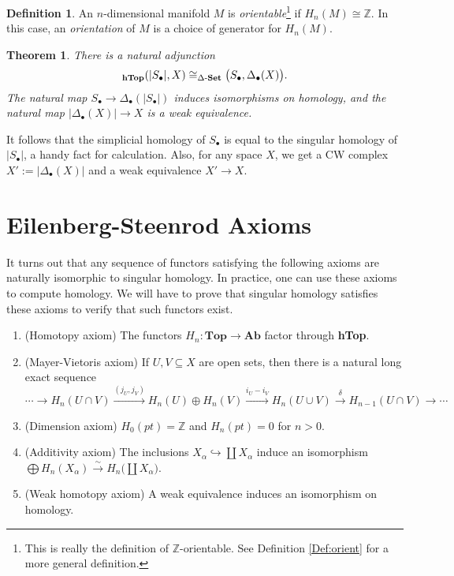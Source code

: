 \documentclass[12pt]{article}
\theoremstyle{plain}
\newtheorem{theorem}[equation]{Theorem}
\theoremstyle{definition}
\newtheorem{definition}[equation]{Definition}
\theoremstyle{remark}
\let\hom\relax %
\DeclareMathOperator{\hom}{Hom}
\newcommand{\ZZ}{\ensuremath{\mathbb{Z}}}
\begin{document}
 \begin{definition}
   An $n$-dimensional manifold $M$ is \emph{orientable}\footnote{This is really the
   definition of $\ZZ$-orientable. See Definition \ref{Def:orient} for a more general
   definition.} if $H_n(M)\cong \ZZ$. In this case, an \emph{orientation} of $M$ is a
   choice of generator for $H_n(M)$.
 \end{definition}
 \begin{theorem}\label{T:DeltaGeomAdjunction}
   There is a natural adjunction
   \[
    \hom_\textrm{\bf hTop}(|S_\bullet|,X) \cong \hom_{\Delta\textrm{-\bf Set}}\bigl(S_\bullet,
    \Delta_\bullet (X)\bigr).
   \]
   The natural map $S_\bullet\to \Delta_\bullet( |S_\bullet|)$ induces isomorphisms on
   homology, and the natural map $|\Delta_\bullet(X)|\to X$ is a weak equivalence.
 \end{theorem}
 It follows that the simplicial homology of $S_\bullet$ is equal to the singular homology
 of $|S_\bullet|$, a handy fact for calculation. Also, for any space $X$, we get a CW
 complex $X':=|\Delta_\bullet(X)|$ and a weak equivalence $X'\to X$.

 \section{Eilenberg-Steenrod Axioms}
 It turns out that any sequence of functors satisfying the following axioms are naturally
 isomorphic to singular homology. In practice, one can use these axioms to compute
 homology. We will have to prove that singular homology satisfies these axioms to verify
 that such functors exist.
 \begin{enumerate}
   \item (Homotopy axiom) The functors $H_n:\textbf{Top}\to \textbf{Ab}$ factor through
   \textbf{hTop}.
   \item {}
   (Mayer-Vietoris axiom) If $U, V\subseteq X$ are open sets, then there is a
   natural long exact sequence
   \[
    \cdots \to H_n(U\cap V)\xrightarrow{(j_U,j_V)} H_n(U)\oplus
    H_n(V)\xrightarrow{i_U-i_V} H_n(U\cup V)\xrightarrow{\ \delta\ }H_{n-1}(U\cap
    V) \to \cdots
   \]
   \item (Dimension axiom) $H_0(pt)=\ZZ$ and $H_n(pt)=0$ for $n>0$.
   \item (Additivity axiom) The inclusions $X_\alpha\hookrightarrow \coprod X_\alpha$
       induce an isomorphism $\bigoplus H_n(X_\alpha) \xrightarrow{\sim}
       H_n\bigl(\coprod X_\alpha\bigr)$.
   \item (Weak homotopy axiom) A weak equivalence induces an isomorphism on homology.
 \end{enumerate}
\end{document}
